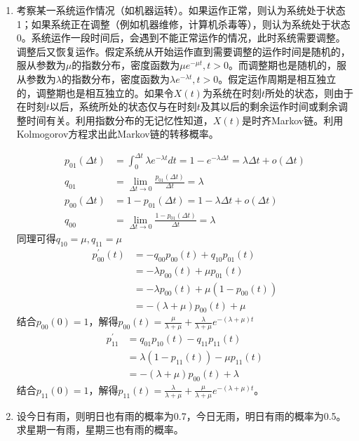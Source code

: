 \begin{enumerate}
	\item 考察某一系统运作情况（如机器运转）。如果运作正常，则认为系统处于状态1；如果系统正在调整（例如机器维修，计算机杀毒等），则认为系统处于状态0。系统运作一段时间后，会遇到不能正常运作的情况，此时系统需要调整。调整后又恢复运作。假定系统从开始运作直到需要调整的运作时间是随机的，服从参数为\(\mu\)的指数分布，密度函数为\(\mu e^{-\mu t},t>0\)。而调整期也是随机的，服从参数为\(\lambda\)的指数分布，密度函数为\(\lambda e^{-\lambda t},t>0\)。假定运作周期是相互独立的，调整期也是相互独立的。如果令\(X(t)\)为系统在时刻\(t\)所处的状态，则由于在时刻\(t\)以后，系统所处的状态仅与在时刻\(t\)及其以后的剩余运作时间或剩余调整时间有关。利用指数分布的无记忆性知道，\(X(t)\)是时齐Markov链。利用Kolmogorov方程求出此Markov链的转移概率。

	      \begin{align*}
		      p_{01}(\Delta t) & =\int_{0}^{\Delta t}\lambda e^{-\lambda t}dt=1-e^{-\lambda \Delta t}=\lambda \Delta t+o(\Delta t) \\
		      q_{01}           & =\lim_{\Delta t \to 0}\frac{p_{01}(\Delta t)}{\Delta t}=\lambda                                   \\
		      p_{00}(\Delta t) & =1-p_{01}(\Delta t)=1-\lambda \Delta t+o(\Delta t)                                                \\
		      q_{00}           & =\lim_{\Delta t \to 0}\frac{1-p_{01}(\Delta t)}{\Delta t}=\lambda
	      \end{align*}
	      同理可得\(q_{10}=\mu,q_{11}=\mu\)
	      \begin{align*}
		      p_{00}^{\prime}(t)
		       & =-q_{00}p_{00}(t)+q_{10}p_{01}(t)    \\
		       & =-\lambda p_{00}(t)+\mu p_{01}(t)    \\
		       & =-\lambda p_{00}(t)+\mu(1-p_{00}(t)) \\
		       & =-(\lambda+\mu)p_{00}(t)+\mu
	      \end{align*}
	      结合\(p_{00}(0)=1\)，解得\(p_{00}(t)=\frac{\mu}{\lambda+\mu}+\frac{\lambda}{\lambda+\mu}e^{-(\lambda+\mu)t}\)
	      \begin{align*}
		      p_{11}^{\prime}
		       & =q_{01}p_{10}(t)-q_{11}p_{11}(t)    \\
		       & =\lambda(1-p_{11}(t))-\mu p_{11}(t) \\
		       & =-(\lambda+\mu)p_{00}(t)+\lambda
	      \end{align*}
	      结合\(p_{11}(0)=1\)，解得\(p_{11}(t)=\frac{\lambda}{\lambda+\mu}+\frac{\mu}{\lambda+\mu}e^{-(\lambda+\mu)t}\)。
	\item 设今日有雨，则明日也有雨的概率为0.7，今日无雨，明日有雨的概率为0.5。求星期一有雨，星期三也有雨的概率。


\end{enumerate}
